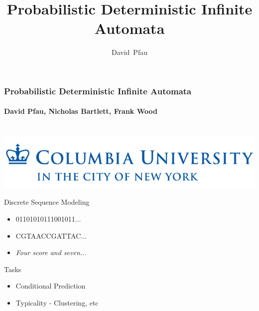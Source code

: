 \documentclass[16pt]{beamer}
\title[Probabilistic Deterministic Infinite Automata] 
{
	Probabilistic Deterministic Infinite Automata
}
\author[D. Pfau, N. Bartlett, F. Wood]
{
  David~Pfau %
}
\institute[Poster T81]
{
  Columbia University
}
\begin{document}
\begin{frame}
	\frametitle{Probabilistic Deterministic Infinite Automata} 
	\framesubtitle{David Pfau, Nicholas Bartlett, Frank Wood}
	\begin{center}\
		\includegraphics[scale=0.4]{columbia_logo.pdf}
	\end{center}
		\begin{block}{Discrete Sequence Modeling}
			\begin{itemize}
				\item{01101010111001011...}
				\item{CGTAACCGATTAC...}
				\item{\em Four score and seven...}
			\end{itemize}
		\end{block}
		\begin{block}{Tasks}
			\begin{itemize}
				\item{Conditional Prediction}
				\item{Typicality - Clustering, etc}
			\end{itemize}
		\end{block}
\end{frame}
\end{document}
